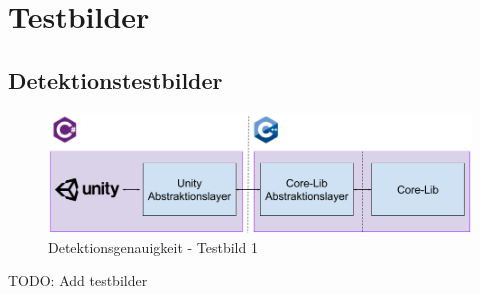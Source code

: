 \section{Testbilder}\label{anhang:testbilder}

\subsection{Detektionstestbilder}\label{anhang:detektionsgenauigkeit:testbilder}
\begin{figure}[h!]
    \begin{center}
        \includegraphics[width=0.8\linewidth]{../common/07_appendix/resources/00_detection/00_detektion_testbild_1.png}
    \end{center}
    \caption{Detektionsgenauigkeit - Testbild 1}
    \label{fig:detektionsgenauigkeit:testbild:1}
\end{figure}
TODO: Add testbilder

